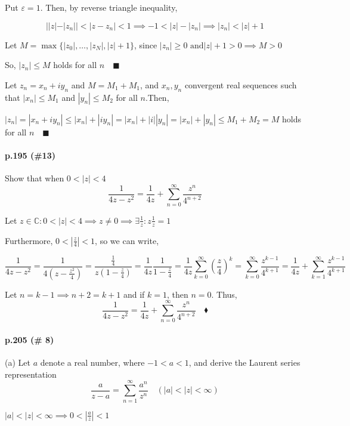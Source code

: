 \documentclass{article}
\newcommand\C{\mathbb{C}}
\begin{document}
Put $\varepsilon = 1.$ Then, by reverse triangle inequality,

\[||z|-|z_n||<|z-z_n| < 1 \implies -1 <  |z| - |z_n|  \implies |z_n|<
  |z| + 1\]

Let $M = \max\{|z_0|,\dots,|z_N|,|z|+1\}$, since $|z_n|\geq 0\text{ and
}|z|+1 >0 \implies M > 0$

So, $|z_n| \leq M$ holds for all $n \quad \blacksquare$


Let $z_n = x_n+iy_n$ and $M = M_1+M_1$, and $x_n,y_n$ convergent real sequences such that $|x_n|\leq M_1$ and
$|y_n|\leq M_2$ for all $n$.Then,

$|z_n| = |x_n+iy_n| \leq |x_n|+ |iy_n| = |x_n|+|i||y_n| =
|x_n|+|y_n|\leq M_1+M_2 = M$ holds for all $n \quad \blacksquare$

\paragraph{p.195 \color{blue}(\#13)\color{black}}

Show that when $0 < |z| < 4$\[\frac{1}{4z-z^2} = \frac{1}{4z} +
  \sum_{n=0}^\infty \frac{z^n}{4^{n+2}}\]

Let $z\in \C:$$0<|z|<4 \implies z\neq 0 \implies \exists \frac{1}{z}:
z\frac{1}{z} = 1$

Furthermore, $0 < \left|\frac{z}{4}\right|<1$, so we can write,

\[\frac{1}{4z-z^2} = \frac{1}{4(z -\frac{z^2}{4})} =
  \frac{\frac{1}{4}}{z(1-\frac{z}{4})} =
  \frac{1}{4z}\frac{1}{1-\frac{z}{4}} = \frac{1}{4z}\sum_{k =
    0}^\infty \left(  \frac{z}{4}\right)^k =  \sum_{k =
    0}^\infty \frac{z^{k-1}}{4^{k+1}} =
  \frac{1}{4z}+\sum_{k=1}^\infty \frac{z^{k-1}}{4^{k+1}}\]

Let $n = k-1 \implies n+2 = k+1$ and if $k = 1$, then $n = 0$. Thus,
\[\frac{1}{4z-z^2} = \frac{1}{4z} +
  \sum_{n=0}^\infty \frac{z^n}{4^{n+2}}\quad \blacklozenge\]

\paragraph{p.205 \color{blue}(\# 8)\color{black}}
(a) Let $a$ denote a real number, where $−1 < a < 1$, and derive the Laurent series
representation
\[\frac{a}{z-a} =\sum_{n = 1}^\infty \frac{a^n}{z^n}\quad
  (|a|<|z|<\infty)\]

$|a|<|z|<\infty \implies 0 < \left| \frac{a}{z} \right|<1$
\end{document}
